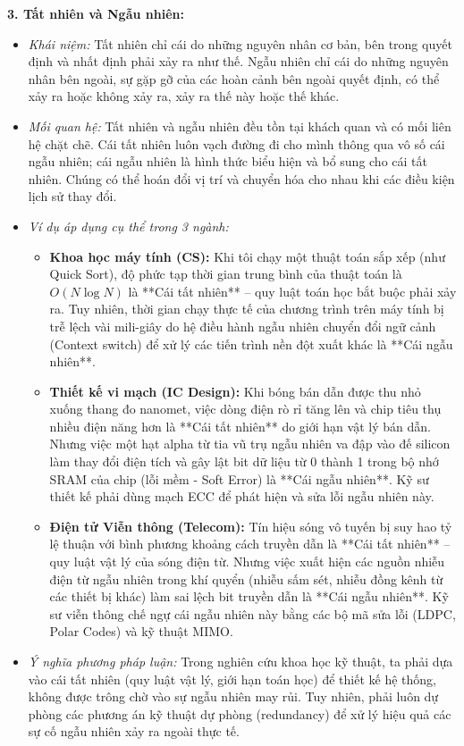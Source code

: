 \documentclass[12pt,a4paper]{article}
\begin{document}
{\noindent
\textbf{3. Tất nhiên và Ngẫu nhiên:}
\begin{itemize}
    \item \textit{Khái niệm:} Tất nhiên chỉ cái do những nguyên nhân cơ bản, bên trong quyết định và nhất định phải xảy ra như thế. Ngẫu nhiên chỉ cái do những nguyên nhân bên ngoài, sự gặp gỡ của các hoàn cảnh bên ngoài quyết định, có thể xảy ra hoặc không xảy ra, xảy ra thế này hoặc thế khác.
    \item \textit{Mối quan hệ:} Tất nhiên và ngẫu nhiên đều tồn tại khách quan và có mối liên hệ chặt chẽ. Cái tất nhiên luôn vạch đường đi cho mình thông qua vô số cái ngẫu nhiên; cái ngẫu nhiên là hình thức biểu hiện và bổ sung cho cái tất nhiên. Chúng có thể hoán đổi vị trí và chuyển hóa cho nhau khi các điều kiện lịch sử thay đổi.
    \item \textit{Ví dụ áp dụng cụ thể trong 3 ngành:}
    \begin{itemize}
        \item \textbf{Khoa học máy tính (CS):} Khi tôi chạy một thuật toán sắp xếp (như Quick Sort), độ phức tạp thời gian trung bình của thuật toán là $O(N \log N)$ là **Cái tất nhiên** -- quy luật toán học bắt buộc phải xảy ra. Tuy nhiên, thời gian chạy thực tế của chương trình trên máy tính bị trễ lệch vài mili-giây do hệ điều hành ngẫu nhiên chuyển đổi ngữ cảnh (Context switch) để xử lý các tiến trình nền đột xuất khác là **Cái ngẫu nhiên**.
        \item \textbf{Thiết kế vi mạch (IC Design):} Khi bóng bán dẫn được thu nhỏ xuống thang đo nanomet, việc dòng điện rò rỉ tăng lên và chip tiêu thụ nhiều điện năng hơn là **Cái tất nhiên** do giới hạn vật lý bán dẫn. Nhưng việc một hạt alpha từ tia vũ trụ ngẫu nhiên va đập vào đế silicon làm thay đổi điện tích và gây lật bit dữ liệu từ 0 thành 1 trong bộ nhớ SRAM của chip (lỗi mềm - Soft Error) là **Cái ngẫu nhiên**. Kỹ sư thiết kế phải dùng mạch ECC để phát hiện và sửa lỗi ngẫu nhiên này.
        \item \textbf{Điện tử Viễn thông (Telecom):} Tín hiệu sóng vô tuyến bị suy hao tỷ lệ thuận với bình phương khoảng cách truyền dẫn là **Cái tất nhiên** -- quy luật vật lý của sóng điện từ. Nhưng việc xuất hiện các nguồn nhiễu điện từ ngẫu nhiên trong khí quyển (nhiễu sấm sét, nhiễu đồng kênh từ các thiết bị khác) làm sai lệch bit truyền dẫn là **Cái ngẫu nhiên**. Kỹ sư viễn thông chế ngự cái ngẫu nhiên này bằng các bộ mã sửa lỗi (LDPC, Polar Codes) và kỹ thuật MIMO.
    \end{itemize}
    \item \textit{Ý nghĩa phương pháp luận:} Trong nghiên cứu khoa học kỹ thuật, ta phải dựa vào cái tất nhiên (quy luật vật lý, giới hạn toán học) để thiết kế hệ thống, không được trông chờ vào sự ngẫu nhiên may rủi. Tuy nhiên, phải luôn dự phòng các phương án kỹ thuật dự phòng (redundancy) để xử lý hiệu quả các sự cố ngẫu nhiên xảy ra ngoài thực tế.
\end{itemize}

}
\end{document}
